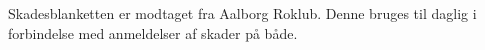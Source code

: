 \label{bil:ark_skade}

Skadesblanketten er modtaget fra Aalborg Roklub. Denne bruges til daglig i forbindelse med anmeldelser af skader på både.

